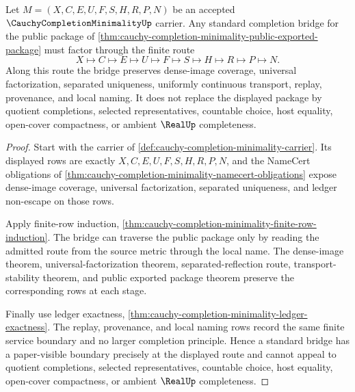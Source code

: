 \begin{theorem}
\label{thm:cauchy-completion-minimality-bridge-boundary}
Let $M=(X,C,E,U,F,S,H,R,P,N)$ be an accepted $\CauchyCompletionMinimalityUp$ carrier. Any standard completion bridge for the public package of \autoref{thm:cauchy-completion-minimality-public-exported-package} must factor through the finite route
$$
X\longmapsto C\longmapsto E\longmapsto U\longmapsto F\longmapsto S\longmapsto H\longmapsto R\longmapsto P\longmapsto N .
$$
Along this route the bridge preserves dense-image coverage, universal factorization, separated uniqueness, uniformly continuous transport, replay, provenance, and local naming. It does not replace the displayed package by quotient completions, selected representatives, countable choice, host equality, open-cover compactness, or ambient $\RealUp$ completeness.
\end{theorem}
\begin{proof}
Start with the carrier of \autoref{def:cauchy-completion-minimality-carrier}. Its displayed rows are exactly $X,C,E,U,F,S,H,R,P,N$, and the NameCert obligations of \autoref{thm:cauchy-completion-minimality-namecert-obligations} expose dense-image coverage, universal factorization, separated uniqueness, and ledger non-escape on those rows.

Apply finite-row induction, \autoref{thm:cauchy-completion-minimality-finite-row-induction}. The bridge can traverse the public package only by reading the admitted route from the source metric through the local name. The dense-image theorem, universal-factorization theorem, separated-reflection route, transport-stability theorem, and public exported package theorem preserve the corresponding rows at each stage.

Finally use ledger exactness, \autoref{thm:cauchy-completion-minimality-ledger-exactness}. The replay, provenance, and local naming rows record the same finite service boundary and no larger completion principle. Hence a standard bridge has a paper-visible boundary precisely at the displayed route and cannot appeal to quotient completions, selected representatives, countable choice, host equality, open-cover compactness, or ambient $\RealUp$ completeness.
\end{proof}

